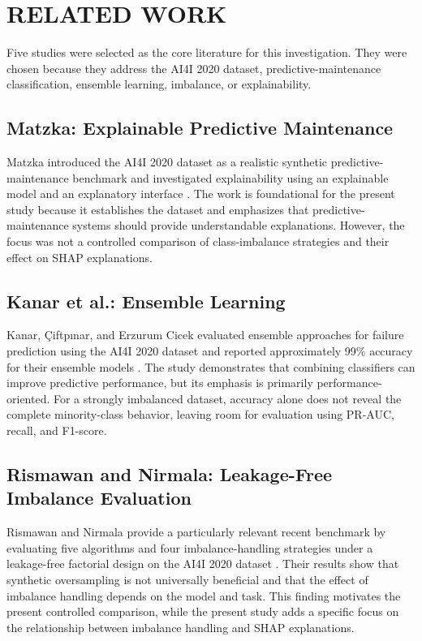 \documentclass[conference]{IEEEtran}
\begin{document}
\section{RELATED WORK}

Five studies were selected as the core literature for this investigation. They were chosen because they address the AI4I 2020 dataset, predictive-maintenance classification, ensemble learning, imbalance, or explainability.

\subsection{Matzka: Explainable Predictive Maintenance}

Matzka introduced the AI4I 2020 dataset as a realistic synthetic predictive-maintenance benchmark and investigated explainability using an explainable model and an explanatory interface \cite{matzka2020explainable}. The work is foundational for the present study because it establishes the dataset and emphasizes that predictive-maintenance systems should provide understandable explanations. However, the focus was not a controlled comparison of class-imbalance strategies and their effect on SHAP explanations.

\subsection{Kanar et al.: Ensemble Learning}

Kanar, Çiftpınar, and Erzurum Cicek evaluated ensemble approaches for failure prediction using the AI4I 2020 dataset and reported approximately 99\% accuracy for their ensemble models \cite{kanar2022ensemble}. The study demonstrates that combining classifiers can improve predictive performance, but its emphasis is primarily performance-oriented. For a strongly imbalanced dataset, accuracy alone does not reveal the complete minority-class behavior, leaving room for evaluation using PR-AUC, recall, and F1-score.

\subsection{Rismawan and Nirmala: Leakage-Free Imbalance Evaluation}

Rismawan and Nirmala provide a particularly relevant recent benchmark by evaluating five algorithms and four imbalance-handling strategies under a leakage-free factorial design on the AI4I 2020 dataset \cite{rismawan2026imbalance}. Their results show that synthetic oversampling is not universally beneficial and that the effect of imbalance handling depends on the model and task. This finding motivates the present controlled comparison, while the present study adds a specific focus on the relationship between imbalance handling and SHAP explanations.
\end{document}
